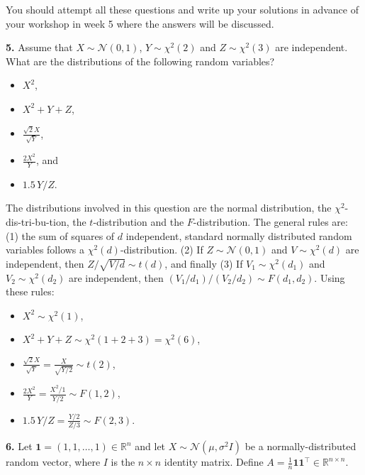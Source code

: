 \documentclass[
  a4paper,
]{article}
\theoremstyle{definition}
\theoremstyle{definition}
\theoremstyle{definition}
\theoremstyle{definition}
\theoremstyle{remark}
\begin{document}
You should attempt all these questions and write up your solutions in advance
of your workshop in week 5 where the answers will be discussed.

\textbf{5.} Assume that \(X \sim \mathcal{N}(0, 1)\), \(Y\sim \chi^2(2)\) and
\(Z \sim \chi^2(3)\) are independent. What are the distributions of
the following random variables?

\begin{itemize}
\item
  \(X^2\),
\item
  \(X^2 + Y + Z\),
\item
  \(\displaystyle\frac{\sqrt{2}X}{\sqrt{Y}}\),
\item
  \(\displaystyle\frac{2X^2}{Y}\), and
\item
  \(1.5\, Y/Z\).
\end{itemize}

\begin{myanswers}

The distributions involved in this question are the normal
distribution, the \(\chi^2\)-dis-tri-bu-tion, the \(t\)-distribution
and the \(F\)-distribution. The general rules are: (1) the sum of
squares of \(d\) independent, standard normally distributed random
variables follows a \(\chi^2(d)\)-distribution. (2) If
\(Z\sim\mathcal{N}(0,1)\) and \(V \sim \chi^2(d)\) are independent, then
\(Z / \sqrt{V / d} \sim t(d)\), and finally (3) If
\(V_1\sim \chi^2(d_1)\) and \(V_2\sim \chi^2(d_2)\) are independent,
then \((V_1/d_1)/(V_2/d_2) \sim F(d_1, d_2)\). Using these rules:

\begin{itemize}
\item
  \(X^2 \sim \chi^2(1)\),
\item
  \(X^2 + Y + Z \sim \chi^2(1+2+3) = \chi^2(6)\),
\item
  \(\displaystyle\frac{\sqrt{2}X}{\sqrt{Y}} = \frac{X}{\sqrt{Y/2}} \sim t(2)\),
\item
  \(\displaystyle\frac{2X^2}{Y} = \frac{X^2/1}{Y/2} \sim F(1,2)\),
\item
  \(\displaystyle 1.5\, Y/Z = \frac{Y/2}{Z/3} \sim F(2, 3)\).
\end{itemize}

\end{myanswers}

\textbf{6.} Let \(\mathbf{1} = (1, 1, \ldots, 1) \in\mathbb{R}^n\) and let \(X \sim \mathcal{N}(\mu, \sigma^2 I)\) be a normally-distributed random vector, where \(I\) is the
\(n\times n\) identity matrix. Define \(A = \frac1n \mathbf{1} \mathbf{1}^\top \in \mathbb{R}^{n\times n}\).
\end{document}
